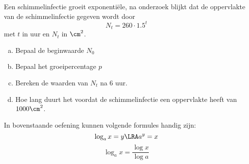 \documentclass[12pt]{article}
\begin{document}
Een schimmelinfectie groeit exponentiële, na onderzoek blijkt dat de oppervlakte van de schimmelinfectie gegeven wordt door
$$N_t=260\cdot 1.5^t$$
met $t$ in uur en $N_t$ in $\cm^2$.
\begin{enumerate}[(a)]
  \item Bepaal de beginwaarde $N_0$
  \item Bepaal het groeipercentage $p$
  \item Bereken de waarden van $N_t$ na 6 uur.
  \item Hoe lang duurt het voordat de schimmelinfectie een oppervlakte heeft van $1000 \cm^2$.
  \end{enumerate}
  \vspace{1cm}
In bovenstaande oefening kunnen volgende formules handig zijn:
$$\log_a{x} = y \LRA a^y=x$$
$$\log_a{x}= \dfrac{\log x}{\log a}$$
\end{document}
